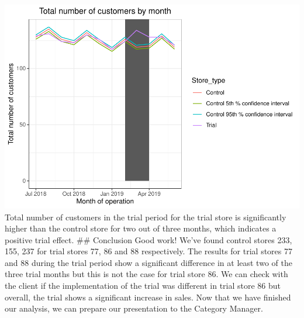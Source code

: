 \documentclass[
]{article}
\begin{document}
\includegraphics{Task2_files/figure-latex/unnamed-chunk-25-1} Total
number of customers in the trial period for the trial store is
significantly higher than the control store for two out of three months,
which indicates a positive trial effect. \#\# Conclusion Good work!
We've found control stores 233, 155, 237 for trial stores 77, 86 and 88
respectively. The results for trial stores 77 and 88 during the trial
period show a significant difference in at least two of the three trial
months but this is not the case for trial store 86. We can check with
the client if the implementation of the trial was different in trial
store 86 but overall, the trial shows a significant increase in sales.
Now that we have finished our analysis, we can prepare our presentation
to the Category Manager.
\end{document}
